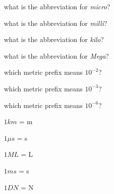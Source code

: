 \documentclass[11pt,addpoints]{exam}  	%
\begin{document}
\begin{questions}
\question[1] what is the abbreviation for \emph{micro}? \fillin[ $\mu$ ]
\vspace{0.2 in}

\question[1] what is the abbreviation for \emph{milli}? \fillin[ $m$ ]
\vspace{0.2 in}


\question[1] what is the abbreviation for \emph{kilo}? \fillin[ $k$ ]
\vspace{0.2 in}

\question[1] what is the abbreviation for \emph{Mega}? \fillin[ $M$ ]
\vspace{0.2 in}

\question[1] which metric prefix means $10^{-2}$?  \fillin[centi]
\vspace{0.2 in}


\question[1] which metric prefix means $10^{-3}$? \fillin[milli]
\vspace{0.2 in}

\question[1] which metric prefix means $10^{-6}$? \fillin[micro]
\vspace{0.2 in}

\question[1] $1 km$ = \fillin[$1000$] m
\vspace{0.2 in}


\question[1] $1 \mu s$ = \fillin[$0.000001$] s
\vspace{0.2 in}

\question[1] $1 ML$ = \fillin[$1,000,000$] L
\vspace{0.2 in}

\question[1] $1 ms$ = \fillin[$0.001$] s
\vspace{0.2 in}

\question[1] $1 DN$ = \fillin[$10$] N
\end{questions}
\end{document}
